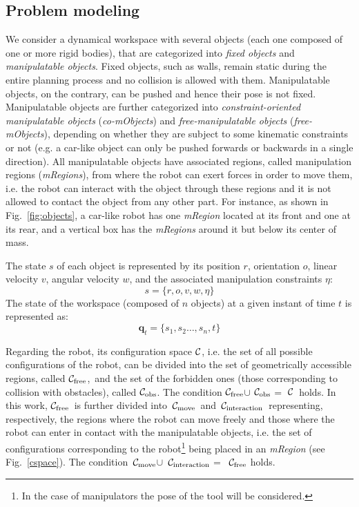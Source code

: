 \documentclass[twocolumn]{svjour3}          %
\newcommand {\Cs}{\hbox{{$\cal C$}}}                %
\newcommand {\Cfree}{\hbox{{$\cal C_{\textrm{free}}$}}}                %
\newcommand {\Cobstacle}{\hbox{{$\cal C_{\textrm{obs}}$}}}                %
\newcommand {\Cint}{\hbox{{$\cal C_{\textrm{interaction}}$}}}                %
\newcommand {\Cmove}{\hbox{{$\cal C_{\textrm{move}}$}}}                %
\begin{document}
\subsection{Problem modeling}

We consider a dynamical workspace with several objects (each one composed of one or more rigid
bodies), that are categorized into \textit{fixed objects} and \textit{manipulatable objects}.
Fixed objects, such as walls, remain static during the entire planning process and no collision is allowed with them.  Manipulatable objects, on the contrary, can be pushed and hence their pose is 
not fixed. Manipulatable objects are further categorized into \textit{constraint-oriented manipulatable objects} (\textit{co-mObjects}) and \textit{free-manipulatable objects} 
(\textit{free-mObjects}), depending on whether they are subject to some kinematic constraints or not (e.g. a car-like object can only be pushed forwards or backwards in a single direction). 
All manipulatable objects have associated regions, called manipulation regions (\textit{mRegions}), from where the robot can exert forces in order to move them, i.e. the robot can  interact with the object 
through these regions and it is not allowed to contact the object from any other part. For instance, as shown in Fig.~\ref{fig:objects}, a car-like robot has one  \textit{mRegion} located at its front 
and one at its rear, and a vertical box has the \textit{mRegions} around it but below its center of mass.

The state $s$ of each object is represented by its position $r$, orientation $o$, linear velocity $v$, angular velocity $w$, and the associated manipulation constraints $\eta$:
\begin{equation}
 s=\{r,o,v,w,\eta\}
\end{equation}
The state of the workspace (composed of $n$ objects) at a given instant of time $t$ is represented as:
\begin{equation}
 \mathbf{q}_t=\{s_1,s_2\dots,s_n,t\}
\end{equation}

Regarding the robot, its configuration space \Cs, i.e. the set of all possible configurations of the
robot, can be divided into the set of geometrically accessible regions, called \Cfree,~and the set of the forbidden ones (those corresponding to collision with obstacles), called \Cobstacle. The 
condition \Cfree $\cup$ \Cobstacle $=$ \Cs\ holds. In this work,
\Cfree~is further divided into~\Cmove~and~\Cint\ representing, respectively, the regions where the robot can move freely and those where the robot can enter in contact with the manipulatable objects, 
i.e. the set of configurations corresponding to the robot\footnote{In the case of manipulators the pose of the tool will be considered.} being placed in an \textit{mRegion}  (see Fig.~\ref{cspace}). 
The condition~\hbox{\Cmove $\cup$ \Cint $=$ \Cfree} holds.
\end{document}
